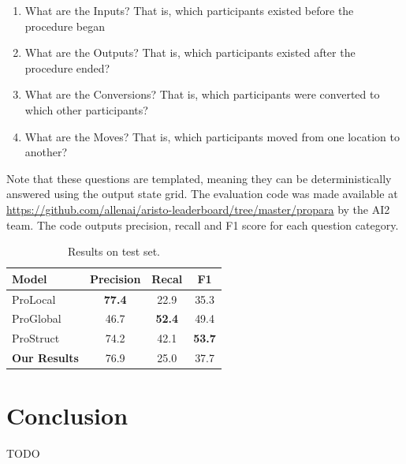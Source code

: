 \documentclass[11pt,a4paper]{article}
\begin{document}
\begin{enumerate}
  \item What are the Inputs? That is, which participants existed before the 
  	  procedure began
  \item What are the Outputs? That is, which participants existed after 
	  the procedure ended?
  \item What are the Conversions? That is, which participants were 
  	  converted to which other participants?
  \item What are the Moves? That is, which participants 
	   moved from one location to another?
\end{enumerate}

Note that these questions are templated, meaning they can be deterministically 
answered using the output state grid. The evaluation code was made available 
at \url{https://github.com/allenai/aristo-leaderboard/tree/master/propara} by 
the AI2 team. The code outputs precision, recall and F1 score for each 
question category.

\begin{table}[t!]
\begin{center}
\begin{tabular}{|l|ccc|}
\hline  \bf Model &  \bf Precision &  \bf Recal &  \bf F1 \\ \hline
ProLocal & \bf 77.4 & 22.9 & 35.3 \\
ProGlobal & 46.7 & \bf 52.4 & 49.4 \\
ProStruct & 74.2 & 42.1 & \bf 53.7 \\
\hline
\bf Our Results & 76.9 & 25.0 & 37.7 \\
\hline
\end{tabular}
\end{center}
\caption{ Results on test set. }
\end{table}

\section{Conclusion}

TODO

%
%
\end{document}
